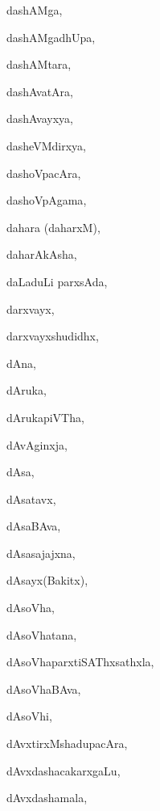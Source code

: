 \begin{multicols}{3}
{\noindent
{dashAMga}, \pageref{dashAMga}

\noindent
{dashAMgadhUpa}, \pageref{dashAMgadhUpa}

\noindent
{dashAMtara}, \pageref{dashAMtara}

\noindent
{dashAvatAra}, \pageref{dashAvatAra}

\noindent
{dashAvayxya}, \pageref{dashAvayxya}

\noindent
{dasheVMdirxya}, \pageref{dasheVMdirxya}

\noindent
{dashoVpacAra}, \pageref{dashoVpacAra}

\noindent
{dashoVpAgama}, \pageref{dashoVpAgama}

\noindent
{dahara (daharxM)}, \pageref{dahara daharxM}

\noindent
{daharAkAsha}, \pageref{daharAkAsha}

\noindent
{daLaduLi parxsAda}, \pageref{daLaduLi parxsAda}

\noindent
{darxvayx}, \pageref{darxvayx}

\noindent
{darxvayxshudidhx}, \pageref{darxvayxshudidhx}

\noindent
{dAna}, \pageref{dAna}

\noindent
{dAruka}, \pageref{dAruka}

\noindent
{dArukapiVTha}, \pageref{dArukapiVTha}

\noindent
{dAvAginxja}, \pageref{dAvAginxja}

\noindent
{dAsa}, \pageref{dAsa}

\noindent
{dAsatavx}, \pageref{dAsatavx}

\noindent
{dAsaBAva}, \pageref{dAsaBAva}

\noindent
{dAsasajajxna}, \pageref{dAsasajajxna}

\noindent
{dAsayx(Bakitx)}, \pageref{dAsayxBakitx}

\noindent
{dAsoVha}, \pageref{dAsoVha}

\noindent
{dAsoVhatana}, \pageref{dAsoVhatana}

\noindent
{dAsoVhaparxtiSAThxsathxla}, \pageref{dAsoVhaparxtiSAThxsathxla}

\noindent
{dAsoVhaBAva}, \pageref{dAsoVhaBAva}

\noindent
{dAsoVhi}, \pageref{dAsoVhi}

\noindent
{dAvxtirxMshadupacAra}, \pageref{dAvxtirxMshadupacAra}

\noindent
{dAvxdashacakarx\-gaLu}, \pageref{dAvxdashacakarxgaLu}

\noindent
{dAvxdashamala}, \pageref{dAvxdashamala}

}
\end{multicols}
